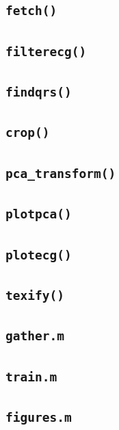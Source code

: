 \documentclass[12pt,letter]{article}
\begin{document}
\subsection{\texttt{fetch()}}
\label{fun:fetch}


\subsection{\texttt{filterecg()}}
\label{fun:filter}


\subsection{\texttt{findqrs()}}
\label{fun:qrs}


\subsection{\texttt{crop()}}
\label{fun:crop}


\subsection{\texttt{pca\_transform()}}
\label{fun:pca}


\subsection{\texttt{plotpca()}}
\label{fun:plotpca}


\subsection{\texttt{plotecg()}}
\label{fun:plotecg}


\subsection{\texttt{texify()}}
\label{fun:tex}


\subsection{\texttt{gather.m}}
\label{scr:gather}


\subsection{\texttt{train.m}}
\label{scr:train}


\subsection{\texttt{figures.m}}
\label{scr:figures}




\end{document}

